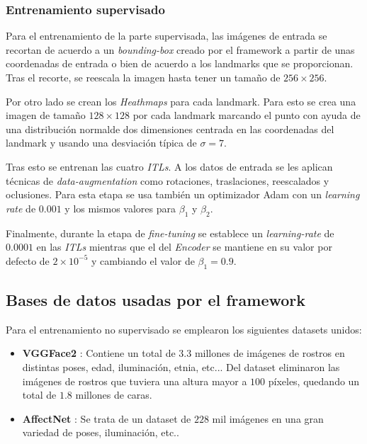        \subsubsection*{Entrenamiento supervisado}
            \noindent Para el entrenamiento de la parte supervisada, las imágenes de entrada se recortan de acuerdo a un \textit{bounding-box} creado por el framework a partir de unas coordenadas de entrada o bien de acuerdo a los landmarks que se proporcionan. Tras el recorte, se reescala la imagen hasta tener un tamaño de $256\times256$. 
            
            \medskip

            \noindent Por otro lado se crean los \textit{Heathmaps} para cada landmark. Para esto se crea una imagen de tamaño $128 \times 128$ por cada landmark marcando el punto con ayuda de una distribución normalde dos dimensiones centrada en las coordenadas del landmark y usando una desviación típica de $\sigma=7$.

            \medskip

            \noindent Tras esto se entrenan las cuatro \textit{ITLs}. A los datos de entrada se les aplican técnicas de \textit{data-augmentation} como rotaciones, traslaciones, reescalados y oclusiones. Para esta etapa se usa también un optimizador Adam con un \textit{learning rate} de $0.001$ y los mismos valores para $\beta_1$ y $\beta_2$.

            \medskip

            \noindent Finalmente, durante la etapa de \textit{fine-tuning} se establece un \textit{learning-rate} de $0.0001$ en las \textit{ITLs} mientras que el del \textit{Encoder} se mantiene en su valor por defecto de $2 \times 10^{-5}$ y cambiando el valor de $\beta_1 = 0.9$.

    \subsection{Bases de datos usadas por el framework}
        
        \noindent Para el entrenamiento no supervisado se emplearon los siguientes datasets unidos: 

        \begin{itemize}
            \item \textbf{VGGFace2} : Contiene un total de $3.3$ millones de imágenes de rostros en distintas poses, edad, iluminación, etnia, etc... Del dataset eliminaron las imágenes de rostros que tuviera una altura mayor a $100$ píxeles, quedando un total de $1.8$ millones de caras.
            \item \textbf{AffectNet} : Se trata de un dataset de $228$ mil imágenes en una gran variedad de poses, iluminación, etc..
        \end{itemize}

